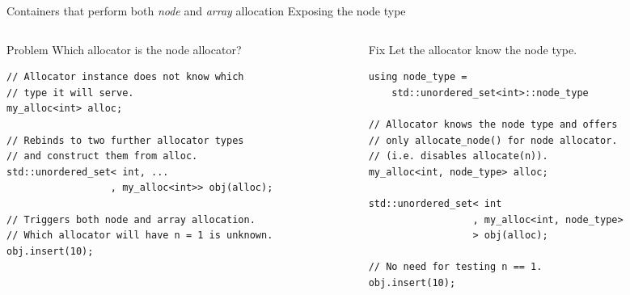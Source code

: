 \documentclass[10pt,aspectratio=169]{beamer}
\begin{document}
\begin{frame}[fragile]
{Containers that perform both {\it node} and {\it array} allocation}
{Exposing the node type}

\begin{columns}
\begin{column}[t]{0.47\textwidth}
\begin{block}{Problem}
Which allocator is the node allocator?
\end{block}
\begin{lstlisting}
// Allocator instance does not know which
// type it will serve.
my_alloc<int> alloc;

// Rebinds to two further allocator types
// and construct them from alloc.
std::unordered_set< int, ...
                  , my_alloc<int>> obj(alloc);

// Triggers both node and array allocation.
// Which allocator will have n = 1 is unknown.
obj.insert(10);
\end{lstlisting}
\end{column}
\begin{column}[t]{0.47\textwidth}
\begin{block}{Fix}
Let the allocator know the node type.
\end{block}
\begin{lstlisting}
using node_type =
    std::unordered_set<int>::node_type

// Allocator knows the node type and offers
// only allocate_node() for node allocator.
// (i.e. disables allocate(n)).
my_alloc<int, node_type> alloc;

std::unordered_set< int
                  , my_alloc<int, node_type>
                  > obj(alloc);

// No need for testing n == 1. 
obj.insert(10);
\end{lstlisting}
\end{column}
\end{columns}

\end{frame}
\end{document}
